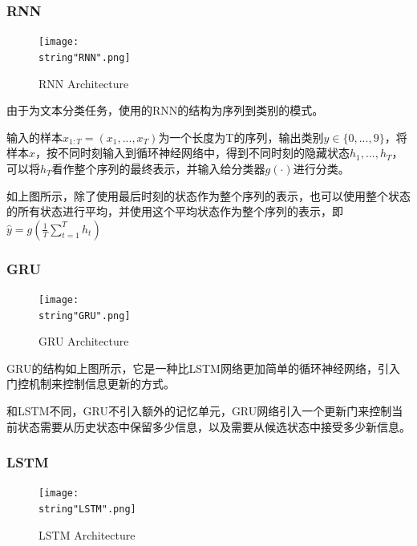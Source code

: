 \documentclass[UTF8]{ctexart}
\begin{document}
\subsubsection{RNN}

\begin{figure}[H]
    \begin{center}
        \texttt{[image: \\string"RNN".png]}
    \caption{RNN Architecture}
    \label{fig:1}
    \end{center}
    \end{figure}
\par
由于为文本分类任务，使用的RNN的结构为序列到类别的模式。\par

输入的样本$x_{1:T}=(x_{1},...,x_{T})$为一个长度为T的序列，输出类别$y{\in}{\{}0,...,9{\}}$，将样本$x$，按不同时刻输入到循环神经网络中，得到不同时刻的隐藏状态$h_{1},...,h_{T}$，可以将$h_{T}$看作整个序列的最终表示，并输入给分类器$g(\cdot)$进行分类。  

如上图\cite{qiu2020nndl}所示，除了使用最后时刻的状态作为整个序列的表示，也可以使用整个状态的所有状态进行平均，并使用这个平均状态作为整个序列的表示，即$\hat{y}=g(\frac{1}{T}\sum\limits_{t=1}^{T}h_{t})$ 



\subsubsection{GRU}
\begin{figure}[H]
    \begin{center}
        \texttt{[image: \\string"GRU".png]}
    \caption{GRU Architecture}
    \label{fig:2}
    \end{center}
    \end{figure}
\par

GRU的结构如上图所示，它是一种比LSTM网络更加简单的循环神经网络，引入门控机制来控制信息更新的方式。\par
和LSTM不同，GRU不引入额外的记忆单元，GRU网络引入一个更新门来控制当前状态需要从历史状态中保留多少信息，以及需要从候选状态中接受多少新信息。 \par

\subsubsection{LSTM}
\begin{figure}[H]
    \begin{center}
        \texttt{[image: \\string"LSTM".png]}
    \caption{LSTM Architecture}
    \label{fig:3}
    \end{center}
    \end{figure}
\par
\end{document}
